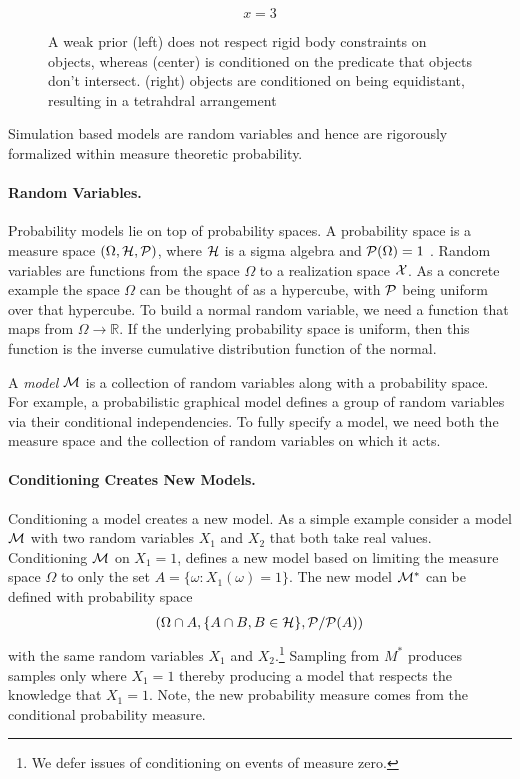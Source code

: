 \begin{figure}[H]
\begin{minipage}[t]{5cm}
$$
x = 3
$$
\end{minipage}
\caption{A weak prior (left) does not respect rigid body constraints on objects, whereas (center) is conditioned on the predicate that objects don't intersect.  (right) objects are conditioned on being equidistant, resulting in a tetrahdral arrangement}
\label{fig:nointersect}
\end{figure}


Simulation based models are random variables and hence are rigorously formalized within measure theoretic probability.

\paragraph{Random Variables.} Probability models lie on top of probability
spaces. A probability space is a measure space $(\Omega, {\cal H}, {\cal P})$,
where ${\cal H}$ is a sigma algebra and ${\cal P}(\Omega) = 1$ \citep{ccinlar2011probability}. Random variables are
functions from the space $\Omega$ to a realization space ${\cal X}$. As a concrete 
example the space $\Omega$ can be thought of as a hypercube, with ${\cal P}$ being
uniform over that hypercube. To build a normal random variable, we need a function
that maps from $\Omega \to \mathbb{R}$. If the underlying probability space is uniform, then
this function is the inverse cumulative distribution function of the normal. 

A \emph{model} ${\cal M}$ is a collection of random variables along with a probability space. 
For example, a probabilistic
graphical model defines a group of random variables via their conditional independencies.
To fully specify a model, we need both the measure space and the
collection of random variables on which it acts.

\paragraph{Conditioning Creates New Models.}
Conditioning a model
creates a new model. As a simple example consider a model ${\cal M}$ with two
random variables $X_1$ and $X_2$ that both take real values. Conditioning
${\cal M}$ on $X_1 = 1$, defines a new model based on limiting the measure space
$\Omega$ to only the set $A = \{ \omega : X_1(\omega) = 1\}$. 
The new model ${\cal M}^*$ can be defined with probability space
\begin{align*}
(\Omega \cap A, \{A \cap B, B \in {\cal H} \}, {\cal P} / {\cal P}(A)) 
\end{align*}
with the same random variables $X_1$ and $X_2$.\footnote{We defer issues of 
conditioning on events of measure zero.} Sampling from $M^*$ produces 
samples only where $X_1 = 1$ thereby producing a model that respects the 
knowledge that $X_1 = 1$. Note, the new probability measure comes
from the conditional probability measure.

